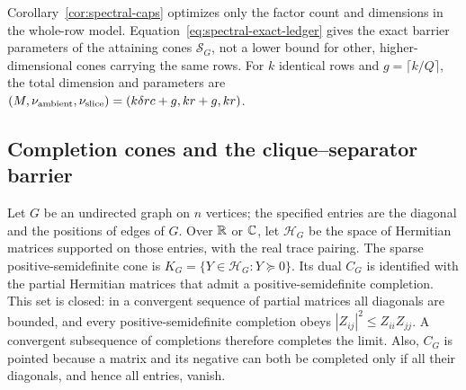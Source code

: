 Corollary~\ref{cor:spectral-caps} optimizes only the factor count and
dimensions in the whole-row model.
Equation~\eqref{eq:spectral-exact-ledger} gives the exact barrier
parameters of the attaining cones $\mathcal S_G$, not a lower bound for
other, higher-dimensional cones carrying the same rows.
For $k$ identical rows and $g=\lceil k/Q\rceil$, the total dimension and
parameters are
$(M,\nu_{\rm ambient},\nu_{\rm slice})=(k\delta rc+g,kr+g,kr)$.

\subsection{Completion cones and the clique--separator barrier}

Let $G$ be an undirected graph on $n$ vertices; the specified entries
are the diagonal and the positions of edges of $G$.  Over $\mathbb R$ or $\mathbb C$, let $\mathcal H_G$ be the space of
Hermitian matrices supported on those entries, with the real trace pairing.
The sparse positive-semidefinite cone is
$K_G=\{Y\in\mathcal H_G:Y\succeq0\}$.
Its dual $C_G$ is identified with the partial Hermitian matrices
that admit a positive-semidefinite completion.  This set is closed:
in a convergent sequence of partial matrices all diagonals are
bounded, and every positive-semidefinite completion obeys
$|Z_{ij}|^2\leq Z_{ii}Z_{jj}$.  A convergent subsequence of completions
therefore completes the limit.  Also, $C_G$ is pointed because a matrix
and its negative can both be completed only if all their diagonals, and
hence all entries, vanish.


